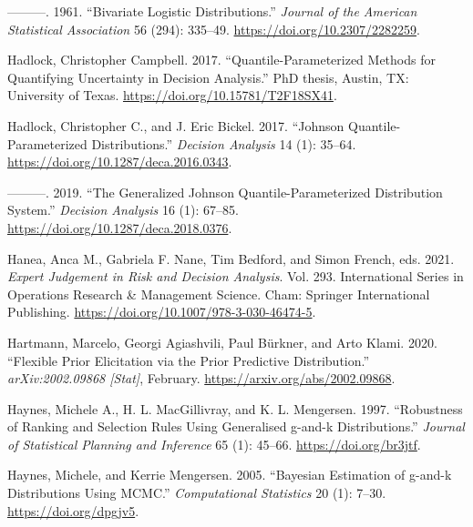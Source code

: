 \documentclass[
]{interact}
\newlength{\cslhangindent}
\newenvironment{CSLReferences}[2] %
 {\begin{list}{}{%
  \setlength{\itemindent}{0pt}
  \setlength{\leftmargin}{0pt}
  \setlength{\parsep}{0pt}
  \ifodd #1
   \setlength{\leftmargin}{\cslhangindent}
   \setlength{\itemindent}{-1\cslhangindent}
  \fi
  \setlength{\itemsep}{#2\baselineskip}}}
 {\end{list}}
\begin{document}
\begin{CSLReferences}{1}{0}
---------. 1961. {``Bivariate {Logistic Distributions}.''} \emph{Journal
of the American Statistical Association} 56 (294): 335--49.
\url{https://doi.org/10.2307/2282259}.

Hadlock, Christopher Campbell. 2017. {``Quantile-Parameterized Methods
for Quantifying Uncertainty in Decision Analysis.''} PhD thesis, Austin,
TX: University of Texas. \url{https://doi.org/10.15781/T2F18SX41}.

Hadlock, Christopher C., and J. Eric Bickel. 2017. {``Johnson
{Quantile-Parameterized Distributions}.''} \emph{Decision Analysis} 14
(1): 35--64. \url{https://doi.org/10.1287/deca.2016.0343}.

---------. 2019. {``The {Generalized Johnson Quantile-Parameterized
Distribution System}.''} \emph{Decision Analysis} 16 (1): 67--85.
\url{https://doi.org/10.1287/deca.2018.0376}.

Hanea, Anca M., Gabriela F. Nane, Tim Bedford, and Simon French, eds.
2021. \emph{Expert {Judgement} in {Risk} and {Decision Analysis}}. Vol.
293. International {Series} in {Operations Research} \& {Management
Science}. Cham: Springer International Publishing.
\url{https://doi.org/10.1007/978-3-030-46474-5}.

Hartmann, Marcelo, Georgi Agiashvili, Paul Bürkner, and Arto Klami.
2020. {``Flexible {Prior Elicitation} via the {Prior Predictive
Distribution}.''} \emph{arXiv:2002.09868 {[}Stat{]}}, February.
\url{https://arxiv.org/abs/2002.09868}.

Haynes, Michele A., H. L. MacGillivray, and K. L. Mengersen. 1997.
{``Robustness of Ranking and Selection Rules Using Generalised g-and-k
Distributions.''} \emph{Journal of Statistical Planning and Inference}
65 (1): 45--66. \url{https://doi.org/br3jtf}.

Haynes, Michele, and Kerrie Mengersen. 2005. {``Bayesian Estimation of
g-and-k Distributions Using {MCMC}.''} \emph{Computational Statistics}
20 (1): 7--30. \url{https://doi.org/dpgjv5}.


\end{CSLReferences}
\end{document}
